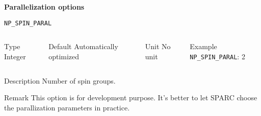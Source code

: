 \begin{frame}[allowframebreaks,c]{} \label{Paral options}

\begin{center}
\Huge \textbf{Parallelization options}
\end{center}

\end{frame}


\begin{frame}[allowframebreaks]{\texttt{NP\_SPIN\_PARAL}} \label{NP_SPIN_PARAL}
\vspace*{-12pt}
\begin{columns}
\begin{block}{Type}
Integer
\end{block}

\begin{block}{Default}
Automatically optimized
\end{block}

\begin{block}{Unit}
No unit
\end{block}

\begin{block}{Example}
\texttt{NP\_SPIN\_PARAL}: 2
\end{block}
\end{columns}

\begin{block}{Description}
Number of spin groups.
\end{block}

\begin{block}{Remark}
This option is for development purpose. It's better to let SPARC choose the parallization parameters in practice.
\end{block}
\end{frame}


